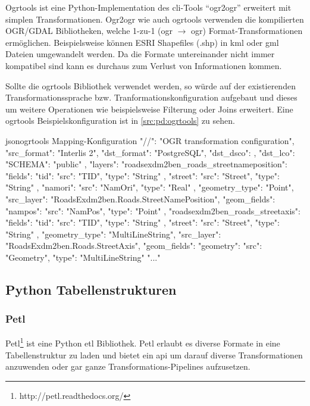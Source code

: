 Ogrtools ist eine Python-Implementation des \acs{cli}-Tools ``ogr2ogr'' erweitert mit simplen Transformationen. Ogr2ogr wie auch ogrtools verwenden die kompilierten OGR/GDAL Bibliotheken, welche 1-zu-1 (ogr $\to$ ogr) Format-Transformationen ermöglichen. Beispielsweise können ESRI Shapefiles (.shp) in \gls{kml} oder \gls{gml} Dateien umgewandelt werden. Da die Formate untereinander nicht immer kompatibel sind kann es durchaus zum Verlust von Informationen kommen.

Sollte die ogrtools Bibliothek verwendet werden, so würde auf der existierenden Transformationssprache bzw. Tranformationskonfiguration aufgebaut und dieses um weitere Operationen wie beispielsweise Filterung oder Joins erweitert. Eine ogrtools Beispielskonfiguration \cite[README, ogrtransform library]{ogrtools} ist in \cref{src:pd:ogrtools} zu sehen.


\begin{srclst}[label=src:pd:ogrtools]{json}{ogrtools Mapping-Konfiguration}
{
  "//": "OGR transformation configuration",
  "src_format": "Interlis 2",
  "dst_format": "PostgreSQL",
  "dst_dsco": {},
  "dst_lco": {
    "SCHEMA": "public"
  },
  "layers": {
    "roadsexdm2ben_roads_streetnameposition": {
      "fields": {
        "tid": {
          "src": "TID",
          "type": "String"
        },
        "street": {
          "src": "Street",
          "type": "String"
        },
        "namori": {
          "src": "NamOri",
          "type": "Real"
        }
      },
      "geometry_type": "Point",
      "src_layer": "RoadsExdm2ben.Roads.StreetNamePosition",
      "geom_fields": {
        "nampos": {
          "src": "NamPos",
          "type": "Point"
        }
      }
    },
    "roadsexdm2ben_roads_streetaxis": {
      "fields": {
        "tid": {
          "src": "TID",
          "type": "String"
        },
        "street": {
          "src": "Street",
          "type": "String"
        }
      },
      "geometry_type": "MultiLineString",
      "src_layer": "RoadsExdm2ben.Roads.StreetAxis",
      "geom_fields": {
        "geometry": {
          "src": "Geometry",
          "type": "MultiLineString"
        }
      }
    }
  }
  "..."
}
\end{srclst}

\subsection{Python Tabellenstrukturen}

\subsubsection{Petl}
Petl\footnote{http://petl.readthedocs.org/} ist eine Python \acs{etl} Bibliothek. Petl erlaubt es diverse Formate in eine Tabellenstruktur zu laden und bietet ein \acs{api} um darauf diverse Transformationen anzuwenden oder gar ganze Transformations-Pipelines aufzusetzen.

